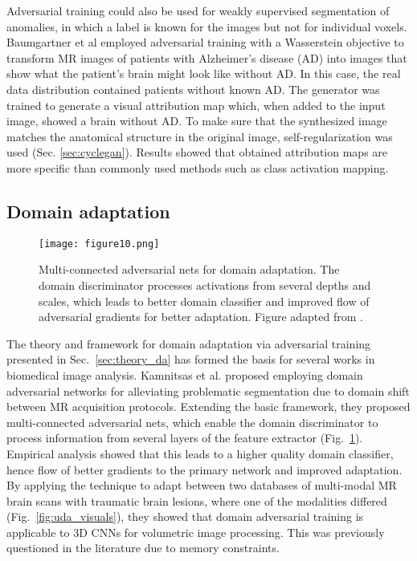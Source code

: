 \documentclass{article}
\begin{document}
Adversarial training could also be used for weakly supervised segmentation of anomalies, in which a label is known for the images but not for individual voxels. Baumgartner et al \cite{Baum17} employed adversarial training with a Wasserstein objective to transform MR images of patients with Alzheimer's disease (AD) into images 
that show what the patient's brain might look like without AD. In this case, the real data distribution contained patients without known AD. The generator was trained to generate a visual attribution map which, when added to the input image, showed a brain without AD. To make sure that the synthesized image matches the anatomical structure in the original image, self-regularization was used (Sec. \ref{sec:cyclegan}). Results showed that obtained attribution maps are more specific than commonly used methods such as class activation mapping.

\subsection{Domain adaptation}
\label{sec:app_dom_adapt}


\begin{figure}[tp]
\centering
\texttt{[image: figure10.png]}
\caption{Multi-connected adversarial nets for domain adaptation. The domain discriminator processes activations from several depths and scales, which leads to better domain classifier and improved flow of adversarial gradients for better adaptation. Figure adapted from \cite{kamnitsas2017unsupervised}.}
\label{fig:multiconn}
\end{figure}

The theory and framework for domain adaptation via adversarial training presented in Sec.~\ref{sec:theory_da} has formed the basis for several works in biomedical image analysis. Kamnitsas et al. \cite{kamnitsas2017unsupervised} proposed employing domain adversarial networks for alleviating problematic segmentation due to domain shift between MR acquisition protocols. Extending the basic framework, they proposed multi-connected adversarial nets, which enable the domain discriminator to process information from several layers of the feature extractor (Fig.~\ref{fig:multiconn}). Empirical analysis showed that this leads to a higher quality domain classifier, hence flow of better gradients to the primary network and improved adaptation.
By applying the technique to adapt between two databases of multi-modal MR brain scans with traumatic brain lesions, where one of the modalities differed (Fig.~\ref{fig:uda_visuals}), they showed that domain adversarial training is applicable to 3D CNNs for volumetric image processing. This was previously questioned in the literature \cite{bermudez2016scalable} due to memory constraints.
\end{document}
